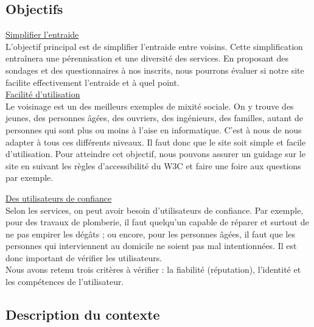 \documentclass[a4paper,11pt]{article}
\begin{document}

\subsection{Objectifs}

\underline{Simplifier l'entraide}\\

L'objectif principal est de simplifier l'entraide entre voisins.
Cette simplification entraînera une pérennisation et une diversité des services.
En proposant des sondages et des questionnaires à nos inscrits, nous pourrons évaluer si notre site facilite effectivement l'entraide et à quel point.\\

\underline{Facilité d'utilisation}\\

Le voisinage est un des meilleurs exemples de mixité sociale.
On y trouve des jeunes, des personnes âgées, des ouvriers, des ingénieurs, des familles, autant de personnes qui sont plus ou moins à l'aise en informatique.
C'est à nous de nous adapter à tous ces différents niveaux. Il faut donc que le site soit simple et facile d'utilisation.
Pour atteindre cet objectif, nous pouvons assurer un guidage sur le site en suivant les règles d'accessibilité du W3C et faire une foire aux questions par exemple.\\

\pagebreak

\underline{Des utilisateurs de confiance}\\

Selon les services, on peut avoir besoin d'utilisateurs de confiance.
Par exemple, pour des travaux de plomberie, il faut quelqu'un capable de réparer et surtout de ne pas empirer les dégâts ; ou encore, pour les personnes âgées, il faut que les personnes qui interviennent au domicile ne soient pas mal intentionnées.
Il est donc important de vérifier les utilisateurs.\\
Nous avons retenu trois critères à vérifier : la fiabilité (réputation), l'identité et les compétences de l'utilisateur.\\



\subsection{Description du contexte}
\end{document}
